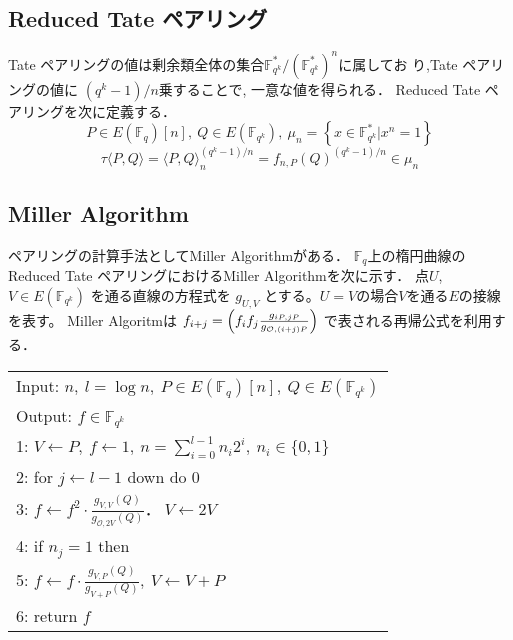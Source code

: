 \documentclass[twocolumn]{jsarticle} %
\begin{document}
\subsection{Reduced Tate ペアリング}
Tate ペアリングの値は剰余類全体の集合$\mathbb{F}_{q^k}^\ast/(\mathbb{F}_{q^k}^\ast)^n$に属してお り,Tate ペアリングの値に $(q^k - 1) / n$乗することで, 一意な値を得られる． Reduced Tate ペアリングを次に定義する．
\vspace{-2mm}
\[P \in E(\mathbb{F}_q)[n],\ Q \in E(\mathbb{F}_{q^k}),\ \mu_n = \left\{ x \in \mathbb{F}_{q^k}^\ast | x^n = 1 \right\}\]
\vspace{-4mm}
\[\tau \langle P,Q \rangle = \langle P,Q \rangle _n^{(q^k - 1) / n} = f_{n,P}(Q)^{(q^k - 1) / n} \in \mu_n\]
\par

\subsection{Miller Algorithm}
ペアリングの計算手法としてMiller Algorithmがある． $\mathbb{F}_q$上の楕円曲線のReduced Tate ペアリングにおけるMiller Algorithmを次に示す． 点$U$, $V ∈ E(\mathbb{F}_{q^k})$ を通る直線の方程式を $g_{U,V}$ とする。$U=V$の場合$V$を通る$E$の接線を表す。 Miller Algoritmは
$f_{i+j}=\Bigl(f_if_j\frac{g_{iP,jP}}{g_{\mathcal{O},(i+j)P}}\Bigr)$
で表される再帰公式を利用する．

\vspace{1zh}
\begin{longtable}
 \begin{center}
  \begin{tabular}{|l|}
     \hline
    Input: $n, \ l=\log n, \ P \in E(\mathbb{F}_q)[n], \ Q \in E(\mathbb{F}_{q^k})$ \\
    Output: $f \in \mathbb{F}_{q^k}$  \\
     \hline
    1: \quad $V \gets P, \ f \gets 1,\ n=\sum^{l-1}_{i=0} n_i 2^i, \ n_i \in \{0,1\}$\\
    2: \quad for $j \gets l-1$ down do 0\\
    3: \quad \quad $f \gets f^2 \cdot \frac{g_{V,V}(Q)}{g_{\mathcal{O}, 2V}(Q)}．\ V \gets 2V$\\
    4: \quad if $n_j = 1$ then\\
    5: \quad \quad $f \gets f \cdot \frac{g_{V,P}(Q)}{g_{V+P}(Q)},\ V \gets V+P$\\
    6: \quad return $f$\\
     \hline
   \end{tabular}
 \end{center}
\end{longtable}
\end{document}
